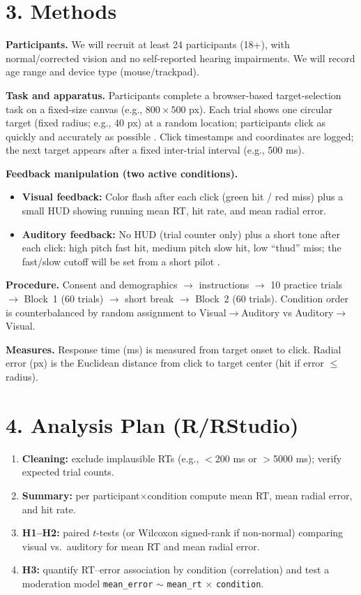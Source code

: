 \documentclass[12pt,letterpaper]{article}
\begin{document}
\section*{3. Methods}
\textbf{Participants.} We will recruit at least 24 participants (18+), with normal/corrected vision and no self-reported hearing impairments. We will record age range and device type (mouse/trackpad).

\textbf{Task and apparatus.} Participants complete a browser-based target-selection task on a fixed-size canvas (e.g., $800\times 500$ px). Each trial shows one circular target (fixed radius; e.g., 40 px) at a random location; participants click as quickly and accurately as possible \citep{mackenzie1992}. Click timestamps and coordinates are logged; the next target appears after a fixed inter-trial interval (e.g., 500 ms).

\textbf{Feedback manipulation (two active conditions).}
\begin{itemize}
  \item \textbf{Visual feedback:} Color flash after each click (green hit / red miss) plus a small HUD showing running mean RT, hit rate, and mean radial error.
  \item \textbf{Auditory feedback:} No HUD (trial counter only) plus a short tone after each click: high pitch fast hit, medium pitch slow hit, low ``thud'' miss; the fast/slow cutoff will be set from a short pilot \citep{hermann2011}.
\end{itemize}

\textbf{Procedure.} Consent and demographics $\rightarrow$ instructions $\rightarrow$ 10 practice trials $\rightarrow$ Block~1 (60 trials) $\rightarrow$ short break $\rightarrow$ Block~2 (60 trials). Condition order is counterbalanced by random assignment to Visual$\rightarrow$Auditory vs Auditory$\rightarrow$Visual.

\textbf{Measures.} Response time (ms) is measured from target onset to click. Radial error (px) is the Euclidean distance from click to target center (hit if error $\le$ radius).

\section*{4. Analysis Plan (R/RStudio)}
\begin{enumerate}
  \item \textbf{Cleaning:} exclude implausible RTs (e.g., $<$200 ms or $>$5000 ms); verify expected trial counts.
  \item \textbf{Summary:} per participant$\times$condition compute mean RT, mean radial error, and hit rate.
  \item \textbf{H1--H2:} paired $t$-tests (or Wilcoxon signed-rank if non-normal) comparing visual vs.\ auditory for mean RT and mean radial error.
  \item \textbf{H3:} quantify RT--error association by condition (correlation) and test a moderation model \texttt{mean\_error} $\sim$ \texttt{mean\_rt} $\times$ \texttt{condition}.
\end{enumerate}
\end{document}
